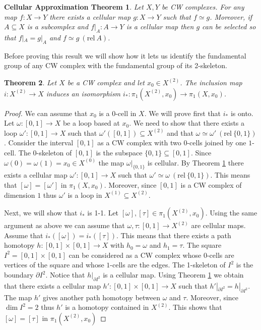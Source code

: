 \documentclass[11pt, letterpaper, oneside]{report}
\theoremstyle{pplain}
\newtheorem{theorem}{Theorem}[chapter]
\newtheorem{CELLAPPROXTHM}[theorem]{Cellular Approximation Theorem}
\theoremstyle{ddefinition}
\theoremstyle{nnn}
\theoremstyle{eexercise}
\newcommand{\rel}{\mathrm{rel\ }}
\begin{document}
\begin{CELLAPPROXTHM}
\label{CELLAPPROX THM}
Let $X, Y$ be CW complexes. For any map $f\colon X \to Y$ there exists a cellular map 
$g\colon X \to Y$ such that $f\simeq g$. Moreover, if $A\subseteq X$ is a subcomplex and 
$f|_{A}\colon A \to Y$ is a cellular map then $g$ can be selected so that   
$f|_{A} = g|_{A}$ and $f\simeq g \ (\rel A)$.
\end{CELLAPPROXTHM}

Before proving this result we will show how it lets us identify the fundamental group
of any CW complex with the fundamental group of its 2-skeleton.

\begin{theorem}
\label{FPI12SKINC THM }
Let $X$ be a CW complex and let $x_{0} \in X^{(2)}$. The inclusion map $i\colon X^{(2)} \to X$
induces an isomorphism $i_{\ast}\colon \pi_{1}(X^{(2)}, x_{0}) \to \pi_{1}(X, x_{0})$.
\end{theorem}

\begin{proof}
We can assume that $x_{0}$ is a $0$-cell in $X$. We will prove first that $i_{\ast}$ is onto. 
Let $\omega\colon [0, 1] \to X$ be a loop based at $x_{0}$. We need to show that there exists 
a loop $\omega'\colon [0, 1] \to X$ such that $\omega'([0, 1])\subseteq X^{(2)}$ and that 
$\omega\simeq \omega' \ (\rel \{0, 1\})$. 
Consider the interval $[0, 1]$ as a CW complex with two $0$-cells joined by one $1$-cell. 
The $0$-skeleton of $[0, 1]$ is the subspace $\{0, 1\}\subseteq [0, 1]$. 
Since  $\omega(0) = \omega(1) = x_{0}\in X^{(0)}$ the map $\omega|_{\{0, 1\}}$ is cellular. 
By Theorem \ref{CELLAPPROX THM} there exists a cellular map $\omega'\colon [0, 1] \to X$
such that $\omega'\simeq \omega \ (\rel \{0, 1\})$. This means that $[\omega] = [\omega']$ 
in $\pi_{1}(X, x_{0})$. Moreover, since $[0, 1]$ is a CW complex of dimension $1$ thus 
$\omega'$ is a loop in $X^{(1)}\subseteq X^{(2)}$. 
 
 Next, we will show that $i_{\ast}$ is 1-1. Let $[\omega], [\tau]\in \pi_{1}(X^{(2)}, x_{0})$.
Using the same argument as above we can assume that $\omega, \tau \colon [0, 1] \to X^{(2)}$
are cellular maps. Assume that $i_{\ast}([\omega]) = i_{\ast}([\tau])$. This means that 
there exists a path homotopy $h\colon [0, 1]\times [0, 1] \to X$ with $h_{0} = \omega$ 
and $h_{1} = \tau$. The square $I^{2} = [0, 1]\times [0, 1]$ can be considered as a CW complex  
whose $0$-cells are vertices of the square and whose $1$-cells are the edges.
The 1-skeleton of $I^{2}$ is  the boundary $\partial I^{2}$. Notice that 
$h|_{\partial I^{2}}$ is a cellular map. Using Theorem \ref{CELLAPPROX THM} we obtain that there 
exists a cellular map $h'\colon [0, 1]\times [0, 1] \to X$ such that $h'|_{\partial I^{2}} = h|_{\partial I^{2}}$.  
The map  $h'$ gives another path homotopy between $\omega$ and $\tau$. Moreover, since 
$\dim I^{2} = 2$ thus $h'$ is a homotopy contained in $X^{(2)}$. This shows that 
$[\omega] = [\tau]$ in $\pi_{1}(X^{(2)}, x_{0})$
 
\end{proof}
\end{document}
